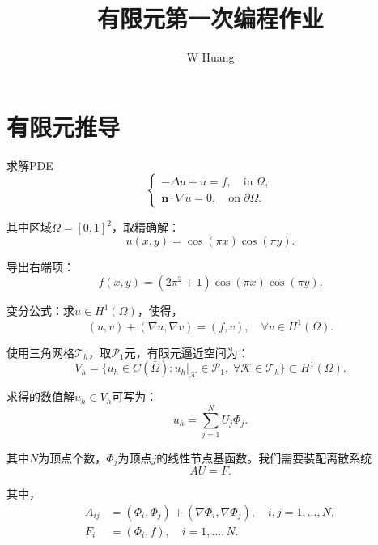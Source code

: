 \documentclass[lang=cn,11pt,a4paper]{elegantpaper}
\title{有限元第一次编程作业}
\author{W Huang}
\date{\zhtoday}
\begin{document}
\maketitle

\section{有限元推导}

求解PDE
\begin{equation}
    \left\{
        \begin{array}{l}
            -\Delta u + u = f,\quad \text{in}\;\Omega,\\
            \mathbf{n}\cdot \nabla u = 0,\quad \text{on}\;\partial\Omega.
        \end{array}
    \right.
\end{equation}

其中区域$\Omega=[0,1]^2$，取精确解：
\begin{equation}
    u(x,y)=\cos(\pi x)\cos(\pi y).
\end{equation}

导出右端项：
\begin{equation}
    f(x,y)=(2\pi^2+1)\cos(\pi x)\cos(\pi y).
\end{equation}

变分公式：求$u\in H^1(\Omega)$，使得，
\begin{equation}
    (u,v)+(\nabla u,\nabla v)=(f,v),\quad \forall v\in H^1(\Omega).
\end{equation}

使用三角网格$\mathcal{T}_h$，取$\mathcal{P}_1$元，有限元逼近空间为：
\begin{equation}
    V_h=\{u_h\in C(\bar{\Omega}):u_h|_\mathcal{K}\in\mathcal{P}_1,\;\forall \mathcal{K}\in\mathcal{T}_h\}\subset H^1(\Omega).
\end{equation}

求得的数值解$u_h\in V_h$可写为：
\begin{equation}
    u_h=\sum_{j=1}^N U_j \Phi_j.
\end{equation}

其中$N$为顶点个数，$\Phi_j$为顶点$j$的线性节点基函数。我们需要装配离散系统
\begin{equation}
    AU=F.
\end{equation}

其中，
\begin{align}
    A_{ij}&=(\Phi_i,\Phi_j)+(\nabla \Phi_i, \nabla \Phi_j),\quad i,j=1,...,N,\\
    F_i&=(\Phi_i,f),\quad i=1,...,N.
\end{align}
\end{document}
